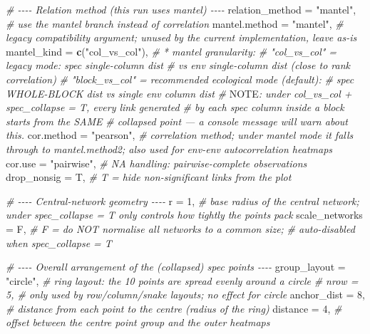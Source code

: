 \documentclass[
]{book}
\newenvironment{Shaded}{\begin{snugshade}}{\end{snugshade}}
\newcommand{\AlertTok}[1]{\textcolor[rgb]{0.94,0.16,0.16}{#1}}
\newcommand{\AttributeTok}[1]{\textcolor[rgb]{0.13,0.29,0.53}{#1}}
\newcommand{\CommentTok}[1]{\textcolor[rgb]{0.56,0.35,0.01}{\textit{#1}}}
\newcommand{\DecValTok}[1]{\textcolor[rgb]{0.00,0.00,0.81}{#1}}
\newcommand{\FunctionTok}[1]{\textcolor[rgb]{0.13,0.29,0.53}{\textbf{#1}}}
\newcommand{\NormalTok}[1]{#1}
\newcommand{\StringTok}[1]{\textcolor[rgb]{0.31,0.60,0.02}{#1}}
\begin{document}
\begin{Shaded}
\begin{Highlighting}[]
  \CommentTok{\# {-}{-}{-}{-} Relation method (this run uses mantel) {-}{-}{-}{-}}
  \AttributeTok{relation\_method =} \StringTok{"mantel"}\NormalTok{,                }\CommentTok{\# use the mantel branch instead of correlation}
  \AttributeTok{mantel.method   =} \StringTok{"mantel"}\NormalTok{,                }\CommentTok{\# legacy compatibility argument; unused by the current implementation, leave as{-}is}
  \AttributeTok{mantel\_kind     =} \FunctionTok{c}\NormalTok{(}\StringTok{"col\_vs\_col"}\NormalTok{),         }\CommentTok{\# * mantel granularity:}
                                             \CommentTok{\#   "col\_vs\_col"   = legacy mode: spec single{-}column dist}
                                             \CommentTok{\#                    vs env single{-}column dist (close to rank correlation)}
                                             \CommentTok{\#   "block\_vs\_col" = recommended ecological mode (default):}
                                             \CommentTok{\#                    spec WHOLE{-}BLOCK dist vs single env column dist}
                                             \CommentTok{\# }\AlertTok{NOTE}\CommentTok{: under col\_vs\_col + spec\_collapse = T, every link generated}
                                             \CommentTok{\#       by each spec column inside a block starts from the SAME}
                                             \CommentTok{\#       collapsed point — a console message will warn about this.}
  \AttributeTok{cor.method =} \StringTok{"pearson"}\NormalTok{,                    }\CommentTok{\# correlation method; under mantel mode it falls through to mantel.method2; also used for env{-}env autocorrelation heatmaps}
  \AttributeTok{cor.use    =} \StringTok{"pairwise"}\NormalTok{,                   }\CommentTok{\# NA handling: pairwise{-}complete observations}
  \AttributeTok{drop\_nonsig =}\NormalTok{ T,                           }\CommentTok{\# T = hide non{-}significant links from the plot}

  \CommentTok{\# {-}{-}{-}{-} Central{-}network geometry {-}{-}{-}{-}}
  \AttributeTok{r =} \DecValTok{1}\NormalTok{,                                     }\CommentTok{\# base radius of the central network; under spec\_collapse = T only controls how tightly the points pack}
  \AttributeTok{scale\_networks =}\NormalTok{ F,                        }\CommentTok{\# F = do NOT normalise all networks to a common size;}
                                             \CommentTok{\#     auto{-}disabled when spec\_collapse = T}

  \CommentTok{\# {-}{-}{-}{-} Overall arrangement of the (collapsed) spec points {-}{-}{-}{-}}
  \AttributeTok{group\_layout =} \StringTok{"circle"}\NormalTok{,                   }\CommentTok{\# ring layout: the 10 points are spread evenly around a circle}
  \CommentTok{\# nrow = 5,                                \# only used by row/column/snake layouts; no effect for circle}
  \AttributeTok{anchor\_dist =} \DecValTok{8}\NormalTok{,                           }\CommentTok{\# distance from each point to the centre (radius of the ring)}
  \AttributeTok{distance    =} \DecValTok{4}\NormalTok{,                           }\CommentTok{\# offset between the centre point group and the outer heatmaps}


\end{Highlighting}
\end{Shaded}
\end{document}
